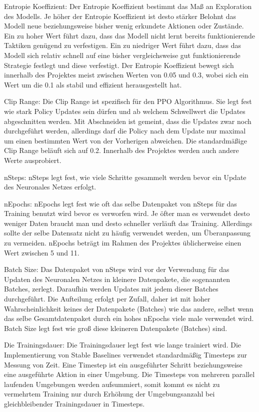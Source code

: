 Entropie Koeffizient: Der Entropie Koeffizient bestimmt das Maß an Exploration des Modells. Je höher der Entropie Koeffizient ist desto stärker Belohnt das Modell neue beziehungsweise bisher wenig erkundete Aktionen oder Zustände. Ein zu hoher Wert führt dazu, dass das Modell nicht lernt bereits funktionierende Taktiken genügend zu verfestigen. Ein zu niedriger Wert führt dazu, dass das Modell sich relativ schnell auf eine bisher vergleichsweise gut funktionierende Strategie festlegt und diese verfestigt. Der Entropie Koeffizient bewegt sich innerhalb des Projektes meist zwischen Werten von 0.05 und 0.3, wobei sich ein Wert um die 0.1 als stabil und effizient herausgestellt hat.

Clip Range: Die Clip Range ist spezifisch für den PPO Algorithmus. Sie legt fest wie stark Policy Updates sein dürfen und ab welchem Schwellwert die Updates abgeschnitten werden. Mit Abschneiden ist gemeint, dass die Updates zwar noch durchgeführt werden, allerdings darf die Policy nach dem Update nur maximal um einen bestimmten Wert von der Vorherigen abweichen. Die standardmäßige Clip Range beläuft sich auf 0.2. Innerhalb des Projektes werden auch andere Werte ausprobiert.

nSteps: nSteps legt fest, wie viele Schritte gesammelt werden bevor ein Update des Neuronales Netzes erfolgt.

nEpochs: nEpochs legt fest wie oft das selbe Datenpaket von nSteps für das Training benutzt wird bevor es verworfen wird. Je öfter man es verwendet desto weniger Daten braucht man und desto schneller verläuft das Training. Allerdings sollte der selbe Datensatz nicht zu häufig verwendet werden, um Überanpassung zu vermeiden. nEpochs beträgt im Rahmen des Projektes üblicherweise einen Wert zwischen 5 und 11.

Batch Size: Das Datenpaket von nSteps wird vor der Verwendung für das Updaten des Neuronalen Netzes in kleinere Datenpakete, die sogenannten Batches, zerlegt. Daraufhin werden Updates mit jedem dieser Batches durchgeführt. Die Aufteilung erfolgt per Zufall, daher ist mit hoher Wahrscheinlichkeit keines der Datenpakete (Batches) wie das andere, selbst wenn das selbe Gesamtdatenpaket durch ein hohes nEpochs viele male verwendet wird. Batch Size legt fest wie groß diese kleineren Datenpakete (Batches) sind.

Die Trainingsdauer: Die Trainingsdauer legt fest wie lange trainiert wird. Die Implementierung von Stable Baselines verwendet standardmäßig Timesteps zur Messung von Zeit. Eine Timestep ist ein ausgeführter Schritt beziehungsweise eine ausgeführte Aktion in einer Umgebung. Die Timesteps von mehreren parallel laufenden Umgebungen werden aufsummiert, somit kommt es nicht zu vermehrtem Training nur durch Erhöhung der Umgebungsanzahl bei gleichbleibender Trainingsdauer in Timesteps.
